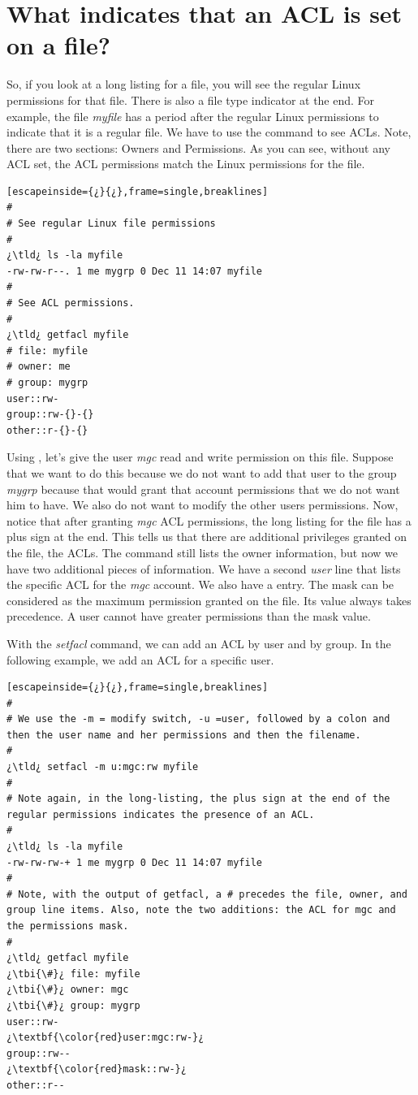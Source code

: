 \section{What indicates that an ACL is set on a file?}

So, if you look at a long listing for a file, you will see the regular Linux permissions for that file. There is also a file type indicator at the end. For example, the file \textsl{myfile} has a period after the regular Linux permissions to indicate that it is a regular file. We have to use the  command to see ACLs. Note, there are two sections: Owners and Permissions. As you can see, without any ACL set, the ACL permissions match the Linux permissions for the file.

\begin{lstlisting}[escapeinside={¿}{¿},frame=single,breaklines]
#
# See regular Linux file permissions
#
¿\tld¿ ls -la myfile
-rw-rw-r--. 1 me mygrp 0 Dec 11 14:07 myfile
#
# See ACL permissions.
#
¿\tld¿ getfacl myfile
# file: myfile
# owner: me
# group: mygrp
user::rw-
group::rw-{}-{}
other::r-{}-{}
\end{lstlisting}

Using , let's give the user \emph{mgc} read and write permission on this file. Suppose that we want to do this because we do not want to add that user to the group \emph{mygrp} because that would grant that account permissions that we do not want him to have. We also do not want to modify the other users permissions. Now, notice that after granting \emph{mgc}  ACL permissions, the long listing for the file has a plus sign at the end. This tells us that there are additional privileges granted on the file, the ACLs.  The  command still lists the owner information, but now we have two additional pieces of information. We have a second \emph{user} line that lists the specific ACL for the \emph{mgc} account. We also have a  entry. The mask can be considered as the maximum permission granted on the file. Its value always takes precedence. A user cannot have greater permissions than the mask value.

With the \emph{setfacl} command, we can add an ACL by user and by group. In the following example, we add an ACL for a specific user.

\begin{lstlisting}[escapeinside={¿}{¿},frame=single,breaklines]
#
# We use the -m = modify switch, -u =user, followed by a colon and then the user name and her permissions and then the filename.
#
¿\tld¿ setfacl -m u:mgc:rw myfile
#
# Note again, in the long-listing, the plus sign at the end of the regular permissions indicates the presence of an ACL.
#
¿\tld¿ ls -la myfile
-rw-rw-rw-+ 1 me mygrp 0 Dec 11 14:07 myfile
#
# Note, with the output of getfacl, a # precedes the file, owner, and group line items. Also, note the two additions: the ACL for mgc and the permissions mask.
#
¿\tld¿ getfacl myfile
¿\tbi{\#}¿ file: myfile
¿\tbi{\#}¿ owner: mgc
¿\tbi{\#}¿ group: mygrp
user::rw-
¿\textbf{\color{red}user:mgc:rw-}¿
group::rw--
¿\textbf{\color{red}mask::rw-}¿
other::r--
\end{lstlisting}

